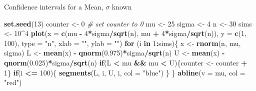 \documentclass[
  ignorenonframetext,
]{beamer}
\newenvironment{Shaded}{\begin{snugshade}}{\end{snugshade}}
\newcommand{\AttributeTok}[1]{\textcolor[rgb]{0.13,0.29,0.53}{#1}}
\newcommand{\CommentTok}[1]{\textcolor[rgb]{0.56,0.35,0.01}{\textit{#1}}}
\newcommand{\ControlFlowTok}[1]{\textcolor[rgb]{0.13,0.29,0.53}{\textbf{#1}}}
\newcommand{\DecValTok}[1]{\textcolor[rgb]{0.00,0.00,0.81}{#1}}
\newcommand{\FloatTok}[1]{\textcolor[rgb]{0.00,0.00,0.81}{#1}}
\newcommand{\FunctionTok}[1]{\textcolor[rgb]{0.13,0.29,0.53}{\textbf{#1}}}
\newcommand{\NormalTok}[1]{#1}
\newcommand{\OtherTok}[1]{\textcolor[rgb]{0.56,0.35,0.01}{#1}}
\newcommand{\SpecialCharTok}[1]{\textcolor[rgb]{0.81,0.36,0.00}{\textbf{#1}}}
\newcommand{\StringTok}[1]{\textcolor[rgb]{0.31,0.60,0.02}{#1}}
\begin{document}
\begin{frame}[fragile]{Confidence intervals for a Mean, \(\sigma\)
known}
\protect\hypertarget{confidence-intervals-for-a-mean-sigma-known-5}{}
\normalsize

\begin{Shaded}
\begin{Highlighting}[]
\FunctionTok{set.seed}\NormalTok{(}\DecValTok{13}\NormalTok{)}
\NormalTok{counter }\OtherTok{\textless{}{-}} \DecValTok{0} \CommentTok{\# set counter to 0}
\NormalTok{mu }\OtherTok{\textless{}{-}} \DecValTok{25}
\NormalTok{sigma }\OtherTok{\textless{}{-}} \DecValTok{4}
\NormalTok{n }\OtherTok{\textless{}{-}} \DecValTok{30}
\NormalTok{sims }\OtherTok{\textless{}{-}} \DecValTok{10}\SpecialCharTok{\^{}}\DecValTok{4}
\FunctionTok{plot}\NormalTok{(}\AttributeTok{x =} \FunctionTok{c}\NormalTok{(mu }\SpecialCharTok{{-}} \DecValTok{4}\SpecialCharTok{*}\NormalTok{sigma}\SpecialCharTok{/}\FunctionTok{sqrt}\NormalTok{(n), mu }\SpecialCharTok{+} \DecValTok{4}\SpecialCharTok{*}\NormalTok{sigma}\SpecialCharTok{/}\FunctionTok{sqrt}\NormalTok{(n)), }
     \AttributeTok{y =} \FunctionTok{c}\NormalTok{(}\DecValTok{1}\NormalTok{, }\DecValTok{100}\NormalTok{), }\AttributeTok{type =} \StringTok{"n"}\NormalTok{, }\AttributeTok{xlab =} \StringTok{""}\NormalTok{, }\AttributeTok{ylab =} \StringTok{""}\NormalTok{)}
\ControlFlowTok{for}\NormalTok{ (i }\ControlFlowTok{in} \DecValTok{1}\SpecialCharTok{:}\NormalTok{sims)\{}
\NormalTok{ x }\OtherTok{\textless{}{-}} \FunctionTok{rnorm}\NormalTok{(n, mu, sigma)}
\NormalTok{ L }\OtherTok{\textless{}{-}} \FunctionTok{mean}\NormalTok{(x) }\SpecialCharTok{{-}} \FunctionTok{qnorm}\NormalTok{(}\FloatTok{0.975}\NormalTok{)}\SpecialCharTok{*}\NormalTok{sigma}\SpecialCharTok{/}\FunctionTok{sqrt}\NormalTok{(n)}
\NormalTok{ U }\OtherTok{\textless{}{-}} \FunctionTok{mean}\NormalTok{(x) }\SpecialCharTok{{-}} \FunctionTok{qnorm}\NormalTok{(}\FloatTok{0.025}\NormalTok{)}\SpecialCharTok{*}\NormalTok{sigma}\SpecialCharTok{/}\FunctionTok{sqrt}\NormalTok{(n)}
 \ControlFlowTok{if}\NormalTok{(L }\SpecialCharTok{\textless{}}\NormalTok{ mu }\SpecialCharTok{\&\&}\NormalTok{ mu }\SpecialCharTok{\textless{}}\NormalTok{ U)\{counter }\OtherTok{\textless{}{-}}\NormalTok{ counter }\SpecialCharTok{+} \DecValTok{1}\NormalTok{\}}
 \ControlFlowTok{if}\NormalTok{(i }\SpecialCharTok{\textless{}=} \DecValTok{100}\NormalTok{)\{}
 \FunctionTok{segments}\NormalTok{(L, i, U, i, }\AttributeTok{col =} \StringTok{"blue"}\NormalTok{)}
\NormalTok{ \}}
\NormalTok{\}}
\FunctionTok{abline}\NormalTok{(}\AttributeTok{v =}\NormalTok{ mu, }\AttributeTok{col =} \StringTok{"red"}\NormalTok{)}
\end{Highlighting}
\end{Shaded}

\normalsize
\end{frame}
\end{document}
